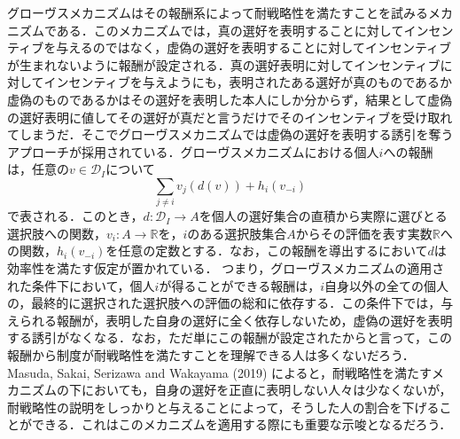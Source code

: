 \documentclass[a4paper, 11pt]{jsarticle}
\begin{document}
グローヴスメカニズムはその報酬系によって耐戦略性を満たすことを試みるメカニズムである．このメカニズムでは，真の選好を表明することに対してインセンティブを与えるのではなく，虚偽の選好を表明することに対してインセンティブが生まれないように報酬が設定される．真の選好表明に対してインセンティブに対してインセンティブを与えようにも，表明されたある選好が真のものであるか虚偽のものであるかはその選好を表明した本人にしか分からず，結果として虚偽の選好表明に値してその選好が真だと言うだけでそのインセンティブを受け取れてしまうだ．そこでグローヴスメカニズムでは虚偽の選好を表明する誘引を奪うアプローチが採用されている．グローヴスメカニズムにおける個人\(i\)への報酬は，任意の\(v \in \mathscr{D}_I\)について
\[\sum_{j \neq i}v_j(d(v)) + h_i(v_{-i})\]
で表される．このとき，\(d: \mathscr{D}_I \rightarrow A\)を個人の選好集合の直積から実際に選びとる選択肢への関数，\(v_i : A \rightarrow \mathbb{R}\)を，\(i\)のある選択肢集合\(A\)からその評価を表す実数\(\mathbb{R}\)への関数，\(h_i(v_{-i})\)を任意の定数とする．なお，この報酬を導出するにおいて\(d\)は効率性を満たす仮定が置かれている．
つまり，グローヴスメカニズムの適用された条件下において，個人\(i\)が得ることができる報酬は，\(i\)自身以外の全ての個人の，最終的に選択された選択肢への評価の総和に依存する．この条件下では，与えられる報酬が，表明した自身の選好に全く依存しないため，虚偽の選好を表明する誘引がなくなる．なお，ただ単にこの報酬が設定されたからと言って，この報酬から制度が耐戦略性を満たすことを理解できる人は多くないだろう．Masuda, Sakai, Serizawa and Wakayama (2019) \cite{Sakai2019}によると，耐戦略性を満たすメカニズムの下においても，自身の選好を正直に表明しない人々は少なくないが，耐戦略性の説明をしっかりと与えることによって，そうした人の割合を下げることができる．これはこのメカニズムを適用する際にも重要な示唆となるだろう．
\end{document}
